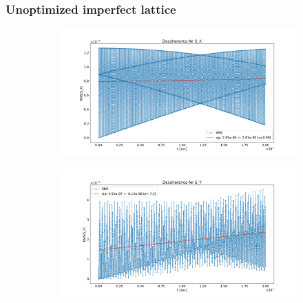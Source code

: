 \documentclass{beamer}
\begin{document}
\begin{frame}\frametitle{Unoptimized imperfect lattice}
  \begin{figure}[H]
    \centering
    \begin{subfigure}[t]{\textwidth}\centering
      \includegraphics[height=.4\paperheight, trim=85 25 120 55, clip]{SX_decoh_20sec_unopt}
    \end{subfigure}

    \begin{subfigure}[t]{\textwidth}\centering
      \includegraphics[height=.4\paperheight, trim=85 25 120 55, clip]{SY_decoh_20sec_unopt}
    \end{subfigure}
  \end{figure}
\end{frame}
\end{document}
